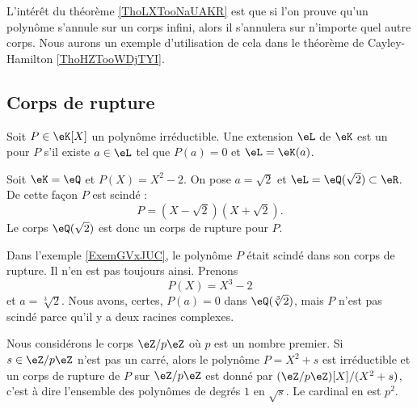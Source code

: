 \begin{remark}
    L'intérêt du théorème \ref{ThoLXTooNaUAKR} est que si l'on prouve qu'un polynôme s'annule sur un corps infini, alors il s'annulera sur n'importe quel autre corps. Nous aurons un exemple d'utilisation de cela dans le théorème de Cayley-Hamilton \ref{ThoHZTooWDjTYI}.
\end{remark}

\subsection{Corps de rupture}

\begin{definition}
    Soit \( P\in\eK[X]\) un polynôme irréductible. Une extension \( \eL\) de \( \eK\) est un  pour \( P\) s'il existe \( a\in \eL\) tel que \( P(a)=0\) et \( \eL=\eK(a)\).
\end{definition}

\begin{example}     \label{ExemGVxJUC}
    Soit \( \eK=\eQ\) et \( P(X)=X^2-2\). On pose \( a=\sqrt{2}\) et \( \eL=\eQ(\sqrt{2})\subset\eR\). De cette façon \( P\) est scindé :
    \begin{equation}
        P=(X-\sqrt{2})(X+\sqrt{2}).
    \end{equation}
    Le corps \( \eQ(\sqrt{2})\) est donc un corps de rupture pour \( P\).
\end{example}

\begin{example}
    Dans l'exemple \ref{ExemGVxJUC}, le polynôme \( P\) était scindé dans son corps de rupture. Il n'en est pas toujours ainsi. Prenons 
    \begin{equation}
        P(X)=X^3-2
    \end{equation}
    et \( a=\sqrt[3]{2}\). Nous avons, certes, \( P(a)=0\) dans \( \eQ(\sqrt[3]{2})\), mais \( P\) n'est pas scindé parce qu'il y a deux racines complexes.
\end{example}

\begin{example}
    Nous considérons le corps \( \eZ/p\eZ\) où \( p\) est un nombre premier. Si \( s\in \eZ/p\eZ\) n'est pas un carré, alors le polynôme \(P= X^2+s\) est irréductible et un corps de rupture de \( P\) sur \( \eZ/p\eZ\) est donné par \( (\eZ/p\eZ)[X]/(X^2+s)\), c'est à dire l'ensemble des polynômes de degrés \( 1\) en \( \sqrt{s}\). Le cardinal en est \( p^2\).
\end{example}

